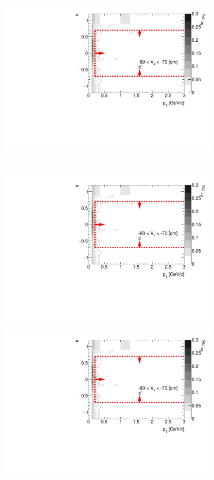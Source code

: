 \begin{figure}[H]\ContinuedFloat
	\parbox{0.325\textwidth}{
		\centering
		\includegraphics[width=\linewidth,page=61]{graphics/systematicsEfficiency/deadMaterial/secondaries_Unbinned_CD_.pdf}\\
	}~
	\parbox{0.325\textwidth}{
		\centering
		\includegraphics[width=\linewidth,page=62]{graphics/systematicsEfficiency/deadMaterial/secondaries_Unbinned_CD_.pdf}\\
	}
	\parbox{0.325\textwidth}{
		\centering
		\includegraphics[width=\linewidth,page=63]{graphics/systematicsEfficiency/deadMaterial/secondaries_Unbinned_CD_.pdf}\\
}
\end{figure}
